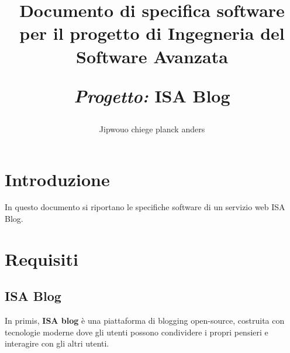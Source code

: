 \documentclass{article}
\title{Documento di specifica software per il progetto di Ingegneria del Software Avanzata\par
    \textit{Progetto:} \textbf{ISA Blog}\\}
\author{Jipwouo chiege planck anders}
\date{}
\begin{document}
\maketitle
\clearpage

\tableofcontents
\clearpage

\section{Introduzione}
\label{sec:introduzione}

In questo documento si riportano le specifiche software di un servizio web ISA Blog.

\section{Requisiti}
\label{sec:requisiti}

\subsection{ISA Blog}

In primis, \textbf{ISA blog} è una piattaforma di blogging open-source, costruita con tecnologie moderne
dove gli utenti possono condividere i propri pensieri e interagire con gli altri utenti.\\
\end{document}
